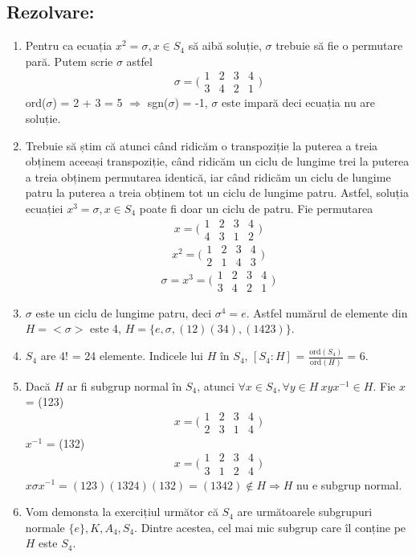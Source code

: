 \documentclass{article}
\begin{document}
\subsection{Rezolvare:}
\begin{enumerate}
    \item Pentru ca ecuația $x^2 = \sigma, x \in S_4$ să aibă soluție, $\sigma$ trebuie să fie o permutare pară. 
    \newline Putem scrie $\sigma$ astfel 
    \[
  \sigma = \bigl(\begin{smallmatrix}
    1 & 2 & 3  & 4 \\
    3 & 4 & 2  & 1
  \end{smallmatrix}\bigr)
\]
ord($\sigma$) = 2 + 3 = 5 $\Rightarrow$ sgn($\sigma$) = -1, $\sigma$ este impară deci ecuația nu are soluție.
    \item Trebuie să știm că atunci când ridicăm o transpoziție la puterea a treia obținem aceeași transpoziție, când ridicăm un ciclu de lungime trei la puterea a treia obținem permutarea identică, iar când ridicăm un ciclu de lungime patru la puterea a treia obținem tot un ciclu de lungime patru. Astfel, soluția ecuației $x^3 = \sigma, x \in S_4$ poate fi doar un ciclu de patru. Fie permutarea
\[
  x = \bigl(\begin{smallmatrix}
    1 & 2 & 3  & 4 \\
    4 & 3 & 1  & 2
  \end{smallmatrix}\bigr)
\]
\[
  x^2 = \bigl(\begin{smallmatrix}
    1 & 2 & 3  & 4 \\
    2 & 1 & 4  & 3
  \end{smallmatrix}\bigr)
\]
\[
  \sigma = x^3 = \bigl(\begin{smallmatrix}
    1 & 2 & 3  & 4 \\
    3 & 4 & 2  & 1
  \end{smallmatrix}\bigr)
\]
    \item $\sigma$ este un ciclu de lungime patru, deci $\sigma^4 = e$. Astfel numărul de elemente din $H = <\sigma>$ este 4, $H = \{ e, \sigma, (12)(34), (1423)\}$.
    \item $S_4$ are 4! = 24 elemente. Indicele lui $H$ în $S_4$, $[S_4:H]$ = $\frac{\text{ord}(S_4)}{\text{ord}(H)}$ = 6.
    \item Dacă $H$ ar fi subgrup normal în $S_4$, atunci $\forall x \in S_4, \forall y \in H \ xyx^{-1} \in H$. Fie $x$ = (123)
    \[
    x = \bigl(\begin{smallmatrix}
    1 & 2 & 3  & 4 \\
    2 & 3 & 1  & 4
  \end{smallmatrix}\bigr)
\] $x^{-1}$ = (132)
    \[
    x = \bigl(\begin{smallmatrix}
    1 & 2 & 3  & 4 \\
    3 & 1 & 2  & 4
  \end{smallmatrix}\bigr)
\] 
$x \sigma x^{-1} = (123)(1324)(132) = (1342) \notin H \Rightarrow H$ nu e subgrup normal.
    \item Vom demonsta la exercițiul următor că $S_4$ are următoarele subgrupuri normale $\{e\}, K, A_4, S_4$. Dintre acestea, cel mai mic subgrup care îl conține pe $H$ este $S_4$.
\end{enumerate}
\end{document}
